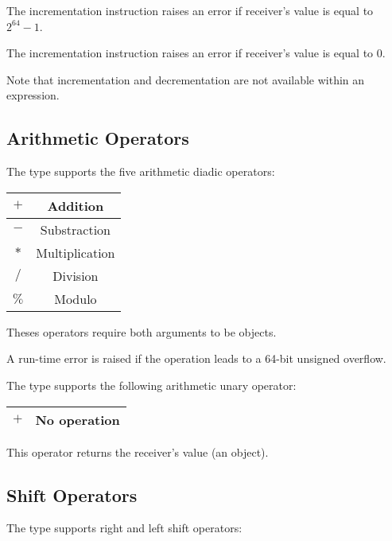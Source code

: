 The incrementation instruction raises an error if receiver's value is equal to $2^{64}-1$.\newline

The incrementation instruction raises an error if receiver's value is equal to 0.\newline

Note that incrementation and decrementation are not available within an expression.




\subsection{Arithmetic Operators}

The  type supports the five arithmetic diadic operators:\newline

\begin{tabular}{|c|c|}
\hline
$+$ & Addition \\
\hline
$-$ & Substraction \\
\hline
$*$ & Multiplication \\
\hline
$/$ & Division \\
\hline
$\%$ & Modulo \\
\hline
\end{tabular}

Theses operators require both arguments to be  objects.\newline

A run-time error is raised if the operation leads to a 64-bit unsigned overflow.

The  type supports the following arithmetic unary operator:\newline

\begin{tabular}{|c|c|}
\hline
$+$ & No operation \\
\hline
\end{tabular}

This operator returns the receiver's value (an   object).




\subsection{Shift Operators}


The  type supports right and left shift operators:\newline


